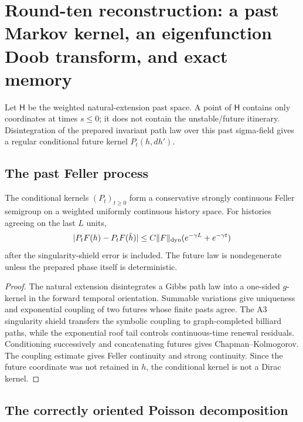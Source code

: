 \section{Round-ten reconstruction: a past Markov kernel, an eigenfunction Doob transform, and exact memory}
\label{sec:r10-a4}

Let \(\mathsf H\) be the weighted natural-extension past space.  A point of
\(\mathsf H\) contains only coordinates at times \(s\le0\); it does not
contain the unstable/future itinerary.  Disintegration of the prepared
invariant path law over this past sigma-field gives a regular conditional
future kernel \(P_t(h,dh')\).

\subsection{The past Feller process}

\begin{theorem}
\label{thm:r10-a4-feller}
The conditional kernels \((P_t)_{t\ge0}\) form a conservative strongly
continuous Feller semigroup on a weighted uniformly continuous history space.
For histories agreeing on the last \(L\) units,
\[
 |P_tF(h)-P_tF(\tilde h)|
 \le C\|F\|_{\rm dyn}(e^{-\gamma L}+e^{-\gamma t})
\]
after the singularity-shield error is included.  The future law is
nondegenerate unless the prepared phase itself is deterministic.
\end{theorem}

\begin{proof}
The natural extension disintegrates a Gibbs path law into a one-sided
\(g\)-kernel in the forward temporal orientation.  Summable variations give
uniqueness and exponential coupling of two futures whose finite pasts agree.
The A3 singularity shield transfers the symbolic coupling to graph-completed
billiard paths, while the exponential roof tail controls continuous-time
renewal residuals.  Conditioning successively and concatenating futures gives
Chapman--Kolmogorov.  The coupling estimate gives Feller continuity and strong
continuity.  Since the future coordinate was not retained in \(h\), the
conditional kernel is not a Dirac kernel.
\end{proof}

\subsection{The correctly oriented Poisson decomposition}

